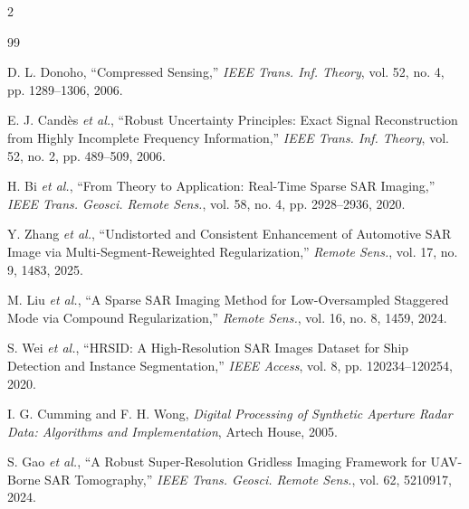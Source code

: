 \documentclass[11pt,fontset=none]{ctexart}
\begin{document}
\begin{multicols}{2}
\footnotesize
\begin{thebibliography}{99}
\setlength{\itemsep}{0pt}

D. L. Donoho, ``Compressed Sensing,'' \textit{IEEE Trans. Inf. Theory}, vol. 52, no. 4, pp. 1289--1306, 2006.

E. J. Cand\`es \textit{et al.}, ``Robust Uncertainty Principles: Exact Signal Reconstruction from Highly Incomplete Frequency Information,'' \textit{IEEE Trans. Inf. Theory}, vol. 52, no. 2, pp. 489--509, 2006.

H. Bi \textit{et al.}, ``From Theory to Application: Real-Time Sparse SAR Imaging,'' \textit{IEEE Trans. Geosci. Remote Sens.}, vol. 58, no. 4, pp. 2928--2936, 2020.

Y. Zhang \textit{et al.}, ``Undistorted and Consistent Enhancement of Automotive SAR Image via Multi-Segment-Reweighted Regularization,'' \textit{Remote Sens.}, vol. 17, no. 9, 1483, 2025.

M. Liu \textit{et al.}, ``A Sparse SAR Imaging Method for Low-Oversampled Staggered Mode via Compound Regularization,'' \textit{Remote Sens.}, vol. 16, no. 8, 1459, 2024.

S. Wei \textit{et al.}, ``HRSID: A High-Resolution SAR Images Dataset for Ship Detection and Instance Segmentation,'' \textit{IEEE Access}, vol. 8, pp. 120234--120254, 2020.

I. G. Cumming and F. H. Wong, \textit{Digital Processing of Synthetic Aperture Radar Data: Algorithms and Implementation}, Artech House, 2005.

S. Gao \textit{et al.}, ``A Robust Super-Resolution Gridless Imaging Framework for UAV-Borne SAR Tomography,'' \textit{IEEE Trans. Geosci. Remote Sens.}, vol. 62, 5210917, 2024.

\end{thebibliography}
\end{multicols}
\end{document}
